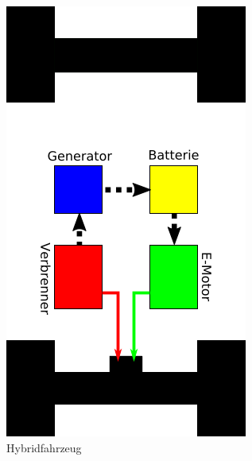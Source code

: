 \begin{figure}[htb]
	\centering
	\begin{minipage}[t]{0.45\linewidth}
		\centering
        \includegraphics[width=0.8\linewidth]{img/HEV3.png}
        \caption{Hybridfahrzeug}
        \label{HEV}
	\end{minipage}
	\hfill
	\begin{minipage}[t]{0.45\linewidth}
		\centering

\end{minipage}
\end{figure}
